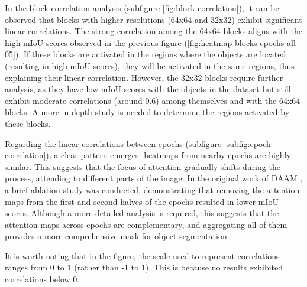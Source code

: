 In the block correlation analysis (subfigure \ref{fig:block-correlation}), it can be observed that blocks with higher resolutions (64x64 and 32x32) exhibit significant linear correlations. The strong correlation among the 64x64 blocks aligns with the high mIoU scores observed in the previous figure (\ref{fig:heatmap-blocks-epochs-all-05}). If these blocks are activated in the regions where the objects are located (resulting in high mIoU scores), they will be activated in the same regions, thus explaining their linear correlation. However, the 32x32 blocks require further analysis, as they have low mIoU scores with the objects in the dataset but still exhibit moderate correlations (around 0.6) among themselves and with the 64x64 blocks. A more in-depth study is needed to determine the regions activated by these blocks.

Regarding the linear correlations between epochs (subfigure \ref{subfig:epoch-correlation}), a clear pattern emerges: heatmaps from nearby epochs are highly similar. This suggests that the focus of attention gradually shifts during the process, attending to different parts of the image. In the original work of DAAM \cite{DAAM}, a brief ablation study was conducted, demonstrating that removing the attention maps from the first and second halves of the epochs resulted in lower mIoU scores. Although a more detailed analysis is required, this suggests that the attention maps across epochs are complementary, and aggregating all of them provides a more comprehensive mask for object segmentation.

It is worth noting that in the figure, the scale used to represent correlations ranges from 0 to 1 (rather than -1 to 1). This is because no results exhibited correlations below 0.

